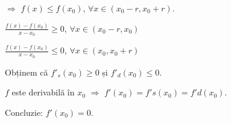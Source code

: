 \vspace{10pt}

$\Rightarrow$ $f(x) \leq f(x_{0})$, $\forall x \in (x_{0} - r, x_{0} + r)$.

\vspace{10pt}

$\frac{\displaystyle f(x) - f(x_{0})}{\displaystyle x - x_{0}} \geq 0$, $\forall x \in (x_{0} - r, x_{0})$

\vspace{3pt}

$\frac{\displaystyle f(x) - f(x_{0})}{\displaystyle x - x_{0}} \leq 0$, $\forall x \in (x_{0}, x_{0} + r)$

\vspace{10pt}

Obținem că $f'_{s}(x_{0}) \geq 0$ și $f'_{d}(x_{0}) \leq 0$.

$f$ este derivabilă în $x_{0}$ $\Rightarrow$ $f'(x_{0}) = f's(x_{0}) = f'd(x_{0})$.

Concluzie: $f'(x_{0}) = 0$.

